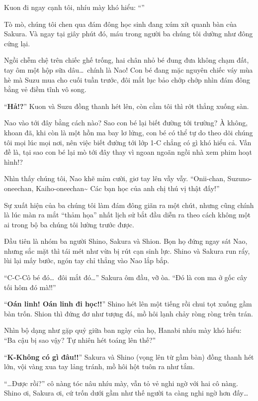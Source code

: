 \documentclass[../main.tex]{subfiles}
\begin{document}
Kuon đi ngay cạnh tôi, nhíu mày khó hiểu: ``''

Tò mò, chúng tôi chen qua đám đông học sinh đang xúm xít quanh bàn của Sakura. Và ngay tại giây phút đó, máu trong người ba chúng tôi dường như đông cứng lại.

Ngồi chễm chệ trên chiếc ghế trống, hai chân nhỏ bé đung đưa không chạm đất, tay ôm một hộp sữa dâu\dots\ chính là Nao! Con bé đang mặc nguyên chiếc váy mùa hè mà Suzu mua cho cuối tuần trước, đôi mắt lục bảo chớp chớp nhìn đám đông bằng vẻ điềm tĩnh vô song.

``\textbf{Hả!?}'' Kuon và Suzu đồng thanh hét lên, còn cằm tôi thì rớt thẳng xuống sàn.

Nao vào tới đây bằng cách nào? Sao con bé lại biết đường tới trường? À không, khoan đã, khi còn là một hồn ma bay lơ lửng, con bé có thể tự do theo dõi chúng tôi mọi lúc mọi nơi, nên việc biết đường tới lớp 1-C chẳng có gì khó hiểu cả. Vấn đề là, tại sao con bé lại mò tới đây thay vì ngoan ngoãn ngồi nhà xem phim hoạt hình!?

Nhìn thấy chúng tôi, Nao khẽ mỉm cười, giơ tay lên vẫy vẫy. ``Onii-chan, Suzuno-oneechan, Kaiho-oneechan\~{} Các bạn học của anh chị thú vị thật đấy!''

Sự xuất hiện của ba chúng tôi làm đám đông giãn ra một chút, nhưng cũng chính là lúc màn ra mắt ``thảm họa'' nhất lịch sử bắt đầu diễn ra theo cách không một ai trong bộ ba chúng tôi lường trước được.

Đầu tiên là nhóm ba người Shino, Sakura và Shion. Bọn họ đứng ngay sát Nao, nhưng sắc mặt thì tái mét như vừa bị rút cạn sinh lực. Shino và Sakura run rẩy, lùi lại mấy bước, ngón tay chỉ thẳng vào Nao lắp bắp.

``C-C-Cô bé đó\dots\ đôi mắt đó\dots'' Sakura ôm đầu, vỡ òa. ``Đó là con ma ở gốc cây tối hôm đó mà!!''

``\textbf{Oán linh! Oán linh đi học!!}'' Shino hét lên một tiếng rồi chui tọt xuống gầm bàn trốn. Shion thì đứng đơ như tượng đá, mồ hôi lạnh chảy ròng ròng trên trán.

Nhìn bộ dạng như gặp quỷ giữa ban ngày của họ, Hanabi nhíu mày khó hiểu: ``Ba cậu bị sao vậy? Tự nhiên hét toáng lên thế?''

``\textbf{K-Không có gì đâu!!}'' Sakura và Shino (vọng lên từ gầm bàn) đồng thanh hét lớn, vội vàng xua tay lảng tránh, mồ hôi hột tuôn ra như tắm.

``\dots Được rồi?'' cô nàng tóc nâu nhíu mày, vẫn tỏ vẻ nghi ngờ với hai cô nàng. Shino ơi, Sakura ơi, cứ trốn dưới gầm như thế người ta càng nghi ngờ hơn đấy\dots
\end{document}

